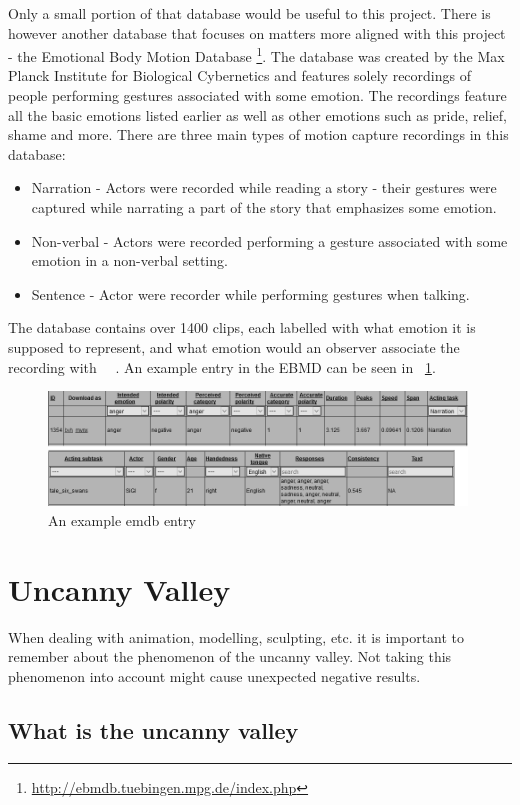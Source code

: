 Only a small portion of that database would be useful to this project. There is however another database that focuses on matters more aligned with this project - the Emotional Body Motion Database \footnote{\url{http://ebmdb.tuebingen.mpg.de/index.php}}. The database was created by the Max Planck Institute for Biological Cybernetics and features solely recordings of people performing gestures associated with some emotion. The recordings feature all the basic emotions listed earlier as well as other emotions such as pride, relief, shame and more. There are three main types of motion capture recordings in this database:
\begin{itemize}
\item Narration - Actors were recorded while reading a story - their gestures were captured while narrating a part of the story that emphasizes some emotion.
\item Non-verbal - Actors were recorded performing a gesture associated with some emotion in a non-verbal setting.
\item Sentence - Actor were recorder while performing gestures when talking.
\end{itemize}
The database contains over 1400 clips, each labelled with what emotion it is supposed to represent, and what emotion would an observer associate the recording with ~\cite{planck1}~\cite{planck2}. An example entry in the EBMD can be seen in ~\ref{fig:ebmd1}.

\begin{figure}[H]
\centerline{\includegraphics[width = 30em]{img/emo1.png}}
\caption{An example emdb entry}\label{fig:ebmd1}
\end{figure}


\section{Uncanny Valley}

When dealing with animation, modelling, sculpting, etc. it is important to remember about the phenomenon of the uncanny valley. Not taking this phenomenon into account might cause unexpected negative results.

\subsection{What is the uncanny valley}

